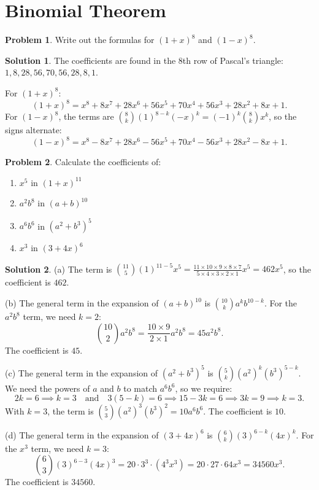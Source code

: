\documentclass[12pt,a4paper]{article}
\numberwithin{equation}{section}
\theoremstyle{plain}
\theoremstyle{definition}
\newtheorem{problem}{Problem}
\theoremstyle{solutionstyle}
\newtheorem*{solution*}{Solution} %
\theoremstyle{definition} %
\begin{document}
	\section*{Binomial Theorem}
	
	\begin{problem}
		Write out the formulas for $(1+x)^8$ and $(1-x)^8$. 
	\end{problem}
	
	\begin{solution*}
		The coefficients are found in the 8th row of Pascal's triangle: $1, 8, 28, 56, 70, 56, 28, 8, 1$.
		
		For $(1+x)^8$:
		\[
		\boxed{(1+x)^8 = x^8 + 8x^7 + 28x^6 + 56x^5 + 70x^4 + 56x^3 + 28x^2 + 8x + 1}.
		\]
		For $(1-x)^8$, the terms are $\binom{8}{k} (1)^{8-k} (-x)^k = (-1)^k \binom{8}{k} x^k$, so the signs alternate: 
		\[
		\boxed{(1-x)^8 = x^8 - 8x^7 + 28x^6 - 56x^5 + 70x^4 - 56x^3 + 28x^2 - 8x + 1}.
		\]
	\end{solution*}
	
	\begin{problem}
		Calculate the coefficients of: 
		\begin{enumerate}[label=(\alph*)]
			\item $x^5$ in $(1+x)^{11}$
			\item $a^2b^8$ in $(a+b)^{10}$
			\item $a^6 b^6$ in $(a^2 + b^3)^5$
			\item $x^3$ in $(3+4x)^6$
		\end{enumerate}
	\end{problem}
	
	\begin{solution*}
		(a) The term is $\displaystyle \binom{11}{5} (1)^{11-5} x^5 = \frac{11 \times 10 \times 9 \times 8 \times 7}{5 \times 4 \times 3 \times 2 \times 1} x^5 = 462 x^5$, so the coefficient is $\boxed{462}$. 
		
		(b) The general term in the expansion of $(a+b)^{10}$ is $\binom{10}{k} a^k b^{10-k}$. For the $a^2b^8$ term, we need $k=2$:
		\[
		\binom{10}{2} a^2 b^8 = \frac{10 \times 9}{2 \times 1} a^2 b^8 = 45 a^2 b^8.
		\]
		The coefficient is $\boxed{45}$. 
		
		(c) The general term in the expansion of $(a^2 + b^3)^5$ is $\binom{5}{k} (a^2)^k (b^3)^{5-k}$. We need the powers of $a$ and $b$ to match $a^6 b^6$, so we require:
		\[
		2k = 6 \implies k=3 \quad \text{and} \quad 3(5-k) = 6 \implies 15 - 3k = 6 \implies 3k = 9 \implies k=3.
		\]
		With $k=3$, the term is $\displaystyle \binom{5}{3} (a^2)^3 (b^3)^2 = 10 a^6 b^6$. The coefficient is $\boxed{10}$. 
		
		(d) The general term in the expansion of $(3+4x)^6$ is $\binom{6}{k} (3)^{6-k} (4x)^k$. For the $x^3$ term, we need $k=3$:
		\[
		\binom{6}{3} (3)^{6-3} (4x)^3 = 20 \cdot 3^3 \cdot (4^3 x^3) = 20 \cdot 27 \cdot 64 x^3 = 34560 x^3.
		\]
		The coefficient is $\boxed{34560}$. 
	\end{solution*}
	
\end{document}
